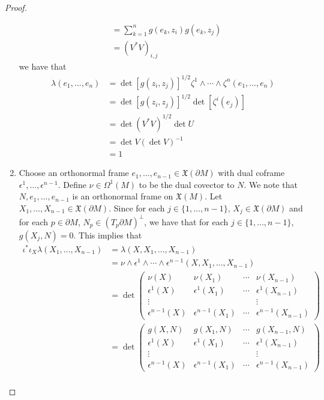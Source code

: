 \documentclass{book}
\theoremstyle{definition}
\newcommand{\ep}{\epsilon}
\newcommand{\ze}{\zeta}
\newcommand{\lam}{\lambda}
\newcommand{\Om}{\Omega}
\DeclareMathOperator*{\0}{\mbf{0}}
\DeclareMathOperator*{\1}{\mbf{1}}
\newcommand{\p}{\partial}
\begin{document}
\begin{proof}
\begin{enumerate}
\begin{align*}
			& = \sum_{k=1}^n  g(e_k, z_i) g(e_k, z_j) \\
			& = (V^*V)_{i,j}
		\end{align*}
		we have that
		\begin{align*}
			\lam(e_1, \ldots, e_n)
			& = \det [g(z_i, z_j)]^{1/2} \ze^1 \wedge \cdots \wedge \ze^n(e_1, \ldots, e_n) \\
			& = \det [g(z_i, z_j)]^{1/2} \det [\ze^i(e_j)] \\
			& = \det (V^*V)^{1/2} \det U \\
			& = \det V (\det V)^{-1} \\
			& = 1
		\end{align*}
		\item Choose an orthonormal frame $e_1, \ldots, e_{n-1} \in \mathfrak{X}(\p M)$ with dual coframe $\ep^1, \ldots, \ep^{n-1}$. Define $\nu \in \Om^1(M)$ to be the dual covector to $N$. We note that $N, e_1, \ldots, e_{n-1}$ is an orthonormal frame on $\mathfrak{X}(M)$. Let $X_1, \ldots, X_{n-1} \in \mathfrak{X}(\p M)$. Since for each $j \in \{1, \ldots, n-1\}$, $X_j \in \mathfrak{X}(\p M)$ and for each $p \in \p M$, $N_p \in (T_p \p M)^{\perp}$, we have that for each $j \in \{1, \ldots, n-1\}$, $g(X_j, N) = 0$. This implies that 
		\begin{align*}
			\iota^* \iota_X \lam (X_1, \ldots, X_{n-1})
			& = \lam(X, X_1, \ldots, X_{n-1}) \\
			& = \nu \wedge \ep^1 \wedge \cdots \wedge \ep^{n-1} (X, X_1, \ldots, X_{n-1})  \\
			& = \det 
			\begin{pmatrix}
				\nu(X)     & \nu(X_1)     & \cdots & \nu(X_{n-1}) \\
				\ep^1(X) & \ep^1(X_1) & \cdots & \ep^1(X_{n-1}) \\ 
				\vdots   &            &        &  \vdots \\
				\ep^{n-1}(X) & \ep^{n-1}(X_1) & \cdots & \ep^{n-1}(X_{n-1})
			\end{pmatrix} \\
			& = \det 
			\begin{pmatrix}
				g(X, N)    & g(X_1, N)     & \cdots & g(X_{n-1}, N) \\
				\ep^1(X)   & \ep^1(X_1)    & \cdots & \ep^1(X_{n-1}) \\ 
				\vdots     &               &        &  \vdots \\
				\ep^{n-1}(X) & \ep^{n-1}(X_1) & \cdots & \ep^{n-1}(X_{n-1})
			\end{pmatrix} \\

\end{align*}
\end{enumerate}
\end{proof}
\end{document}
